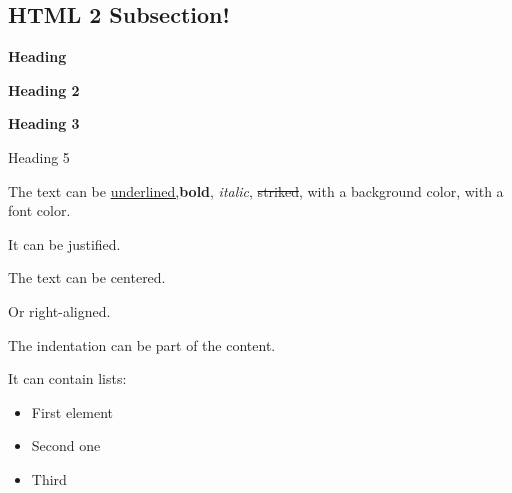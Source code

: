 \documentclass[letter,titlepage,oneside,11pt]{report}%
\begin{document}
\subsection{HTML 2 Subsection!}%
\par%
\par%
\begin{FlushLeft}%
{\Huge \textbf{Heading}}%
\end{FlushLeft}%
\par%
\begin{FlushLeft}%
{\huge \textbf{Heading 2}}%
\end{FlushLeft}%
\par%
\begin{FlushLeft}%
{\LARGE \textbf{Heading 3}}%
\end{FlushLeft}%
\par%
\begin{FlushLeft}%
{\Large Heading 5}%
\end{FlushLeft}%
\par%
\begin{FlushLeft}%
The text can be \underline{underlined,}\textbf{bold}, \textit{italic}, \sout{striked}, with a \colorbox[rgb]{0.8,0.8,0.0}{background color}, with a {\color[rgb]{0.5568627450980392,0.26666666666666666,0.6784313725490196}font color.}%
\end{FlushLeft}%
\par%
\begin{justify}%
It can be justified.%
\end{justify}%
\par%
\begin{Center}%
The text can be centered.%
\end{Center}%
\par%
\begin{FlushRight}%
Or right-aligned.%
\end{FlushRight}%
\par%
\begin{FlushLeft}%
The indentation can be part of the content.%
\end{FlushLeft}%
\par%
\begin{FlushLeft}%
It can contain lists:%
\end{FlushLeft}%
\begin{itemize}%
\item First element%
\item Second one%
\item Third%
\end{itemize}%
\end{document}
